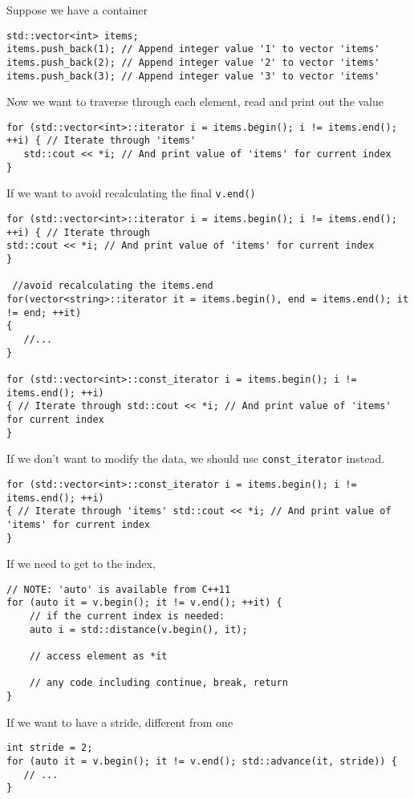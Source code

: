 Suppose we have a container
\begin{lstlisting}
std::vector<int> items;
items.push_back(1); // Append integer value '1' to vector 'items'
items.push_back(2); // Append integer value '2' to vector 'items'
items.push_back(3); // Append integer value '3' to vector 'items'
\end{lstlisting}
Now we want to traverse through each element, read and print out the value
\begin{lstlisting}
for (std::vector<int>::iterator i = items.begin(); i != items.end(); ++i) { // Iterate through 'items'
   std::cout << *i; // And print value of 'items' for current index
}
\end{lstlisting}

If we want to avoid recalculating the final \verb!v.end()!
\begin{verbatim}
for (std::vector<int>::iterator i = items.begin(); i != items.end(); ++i) { // Iterate through
std::cout << *i; // And print value of 'items' for current index
}

 //avoid recalculating the items.end
for(vector<string>::iterator it = items.begin(), end = items.end(); it != end; ++it)
{
   //...
}

for (std::vector<int>::const_iterator i = items.begin(); i != items.end(); ++i)
{ // Iterate through std::cout << *i; // And print value of 'items' for current index
}
\end{verbatim}

If we don't want to modify the data, we should use
\verb!const_iterator! instead.
\begin{lstlisting}
for (std::vector<int>::const_iterator i = items.begin(); i != items.end(); ++i)
{ // Iterate through 'items' std::cout << *i; // And print value of 'items' for current index
}
\end{lstlisting}

If we need to get to the index,
\begin{lstlisting}
// NOTE: 'auto' is available from C++11
for (auto it = v.begin(); it != v.end(); ++it) {
    // if the current index is needed:
    auto i = std::distance(v.begin(), it); 

    // access element as *it

    // any code including continue, break, return
}
\end{lstlisting}

If we want to have a stride, different from one
\begin{lstlisting}
int stride = 2;
for (auto it = v.begin(); it != v.end(); std::advance(it, stride)) {
   // ...
}
\end{lstlisting}

